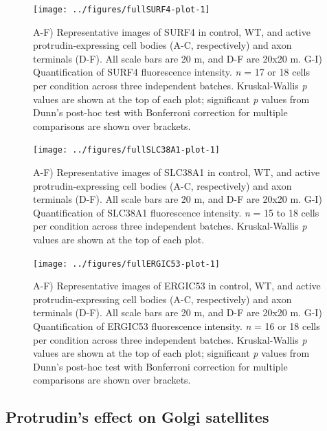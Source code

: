 \documentclass[
  12pt,
  a4paper,
]{book}
\begin{document}
\begin{figure}[H]
\texttt{[image: ../figures/fullSURF4-plot-1]} \caption[SURF4 localisation in protrudin-expressing neurons]{A-F) Representative images of SURF4 in control, WT, and active protrudin-expressing cell bodies (A-C, respectively) and axon terminals (D-F). All scale bars are 20 \textmu{}m, and D-F are 20x20 \textmu{}m. G-I) Quantification of SURF4 fluorescence intensity. \emph{n} = 17 or 18 cells per condition across three independent batches. Kruskal-Wallis \emph{p} values are shown at the top of each plot; significant \emph{p} values from Dunn's post-hoc test with Bonferroni correction for multiple comparisons are shown over brackets.}\label{fig:SURF4-plot}
\end{figure}



\begin{figure}[H]
\texttt{[image: ../figures/fullSLC38A1-plot-1]} \caption[SLC38A1 localisation in protrudin-expressing neurons]{A-F) Representative images of SLC38A1 in control, WT, and active protrudin-expressing cell bodies (A-C, respectively) and axon terminals (D-F). All scale bars are 20 \textmu{}m, and D-F are 20x20 \textmu{}m. G-I) Quantification of SLC38A1 fluorescence intensity. \emph{n} = 15 to 18 cells per condition across three independent batches. Kruskal-Wallis \emph{p} values are shown at the top of each plot.}\label{fig:SLC38A1-plot}
\end{figure}



\begin{figure}[H]
\texttt{[image: ../figures/fullERGIC53-plot-1]} \caption[ERGIC53 localisation in protrudin-expressing neurons]{A-F) Representative images of ERGIC53 in control, WT, and active protrudin-expressing cell bodies (A-C, respectively) and axon terminals (D-F). All scale bars are 20 \textmu{}m, and D-F are 20x20 \textmu{}m. G-I) Quantification of ERGIC53 fluorescence intensity. \emph{n} = 16 or 18 cells per condition across three independent batches. Kruskal-Wallis \emph{p} values are shown at the top of each plot; significant \emph{p} values from Dunn's post-hoc test with Bonferroni correction for multiple comparisons are shown over brackets.}\label{fig:ERGIC53-plot}
\end{figure}

\subsection{Protrudin's effect on Golgi satellites}\label{protrudins-effect-on-golgi-satellites}
\end{document}
